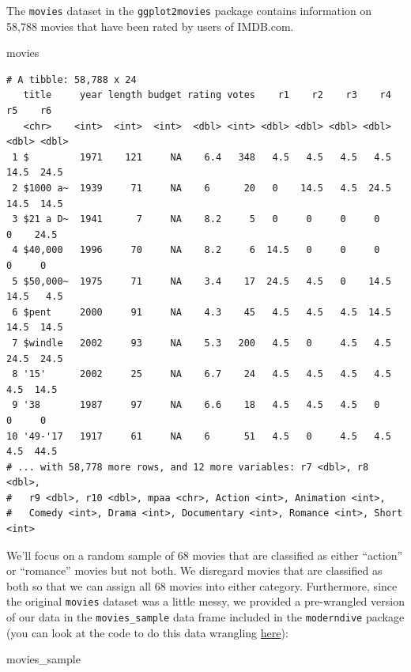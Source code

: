 \documentclass[
  letterpaper,
  DIV=11,
  numbers=noendperiod]{scrreprt}
\newenvironment{Shaded}{\begin{snugshade}}{\end{snugshade}}
\newcommand{\NormalTok}[1]{\textcolor[rgb]{0.00,0.23,0.31}{#1}}
\theoremstyle{definition}
\theoremstyle{remark}
\begin{document}
The \texttt{movies} dataset in the \texttt{ggplot2movies} package
contains information on 58,788 movies that have been rated by users of
IMDB.com.

\begin{Shaded}
\begin{Highlighting}[]
\NormalTok{movies}
\end{Highlighting}
\end{Shaded}

\begin{verbatim}
# A tibble: 58,788 x 24
   title     year length budget rating votes    r1    r2    r3    r4    r5    r6
   <chr>    <int>  <int>  <int>  <dbl> <int> <dbl> <dbl> <dbl> <dbl> <dbl> <dbl>
 1 $         1971    121     NA    6.4   348   4.5   4.5   4.5   4.5  14.5  24.5
 2 $1000 a~  1939     71     NA    6      20   0    14.5   4.5  24.5  14.5  14.5
 3 $21 a D~  1941      7     NA    8.2     5   0     0     0     0     0    24.5
 4 $40,000   1996     70     NA    8.2     6  14.5   0     0     0     0     0  
 5 $50,000~  1975     71     NA    3.4    17  24.5   4.5   0    14.5  14.5   4.5
 6 $pent     2000     91     NA    4.3    45   4.5   4.5   4.5  14.5  14.5  14.5
 7 $windle   2002     93     NA    5.3   200   4.5   0     4.5   4.5  24.5  24.5
 8 '15'      2002     25     NA    6.7    24   4.5   4.5   4.5   4.5   4.5  14.5
 9 '38       1987     97     NA    6.6    18   4.5   4.5   4.5   0     0     0  
10 '49-'17   1917     61     NA    6      51   4.5   0     4.5   4.5   4.5  44.5
# ... with 58,778 more rows, and 12 more variables: r7 <dbl>, r8 <dbl>,
#   r9 <dbl>, r10 <dbl>, mpaa <chr>, Action <int>, Animation <int>,
#   Comedy <int>, Drama <int>, Documentary <int>, Romance <int>, Short <int>
\end{verbatim}

We'll focus on a random sample of 68 movies that are classified as
either ``action'' or ``romance'' movies but not both. We disregard
movies that are classified as both so that we can assign all 68 movies
into either category. Furthermore, since the original \texttt{movies}
dataset was a little messy, we provided a pre-wrangled version of our
data in the \texttt{movies\_sample} data frame included in the
\texttt{moderndive} package (you can look at the code to do this data
wrangling
\href{https://github.com/moderndive/moderndive/blob/master/data-raw/process_data_sets.R\#L14}{here}):

\begin{Shaded}
\begin{Highlighting}[]
\NormalTok{movies\_sample}
\end{Highlighting}
\end{Shaded}
\end{document}
